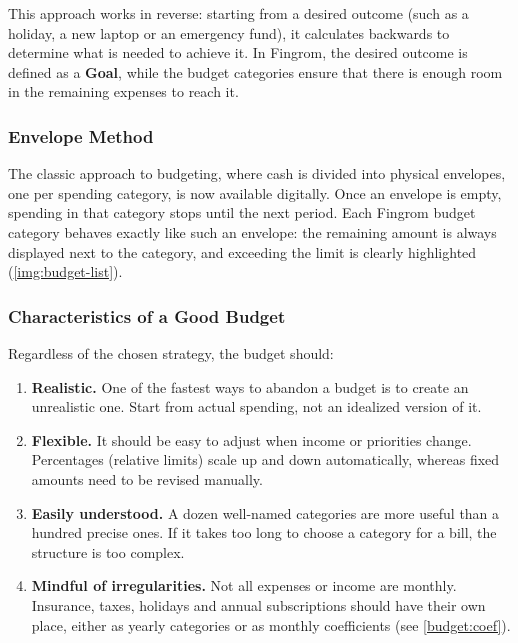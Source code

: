 This approach works in reverse: starting from a desired outcome (such as a holiday, a new
laptop or an emergency fund), it calculates backwards to determine what is needed to achieve
it. In Fingrom, the desired outcome is defined as a \textbf{Goal}, while the budget
categories ensure that there is enough room in the remaining expenses to reach it.


\subsubsection{Envelope Method}

The classic approach to budgeting, where cash is divided into physical envelopes, one per
spending category, is now available digitally. Once an envelope is empty, spending in that
category stops until the next period. Each Fingrom budget category behaves exactly like such
an envelope: the remaining amount is always displayed next to the category, and exceeding the
limit is clearly highlighted (\cref{img:budget-list}).



\subsubsection{Characteristics of a Good Budget}

Regardless of the chosen strategy, the budget should:

\begin{enumerate}
  \item \textbf{Realistic.} One of the fastest ways to abandon a budget is to create an
  unrealistic one. Start from actual spending, not an idealized version of it.
  \item \textbf{Flexible.} It should be easy to adjust when income or priorities change.
  Percentages (relative limits) scale up and down automatically, whereas fixed amounts need
  to be revised manually.
  \item \textbf{Easily understood.} A dozen well-named categories are more useful than a
  hundred precise ones. If it takes too long to choose a category for a bill, the structure
  is too complex.
  \item \textbf{Mindful of irregularities.} Not all expenses or income are monthly.
  Insurance, taxes, holidays and annual subscriptions should have their own place, either as
  yearly categories or as monthly coefficients (see \cref{budget:coef}).
\end{enumerate}

